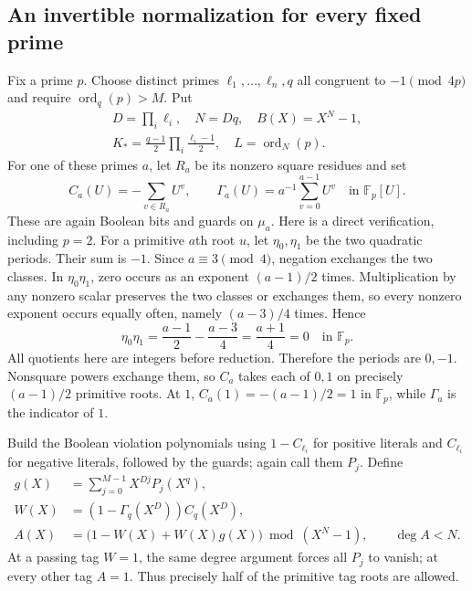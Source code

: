 \subsection{An invertible normalization for every fixed prime}
Fix a prime $p$. Choose distinct primes $\ell_1,\ldots,\ell_n,q$ all congruent to $-1\pmod{4p}$ and require $\operatorname{ord}_q(p)>M$. Put
\begin{gather*}
 D=\prod_i\ell_i,\quad N=Dq,\quad B(X)=X^N-1,\\
 K_* =\frac{q-1}{2}\prod_i\frac{\ell_i-1}{2},\quad
 L=\operatorname{ord}_N(p).
\end{gather*}
For one of these primes $a$, let $R_a$ be its nonzero square residues and set
\[
 C_a(U)=-\sum_{v\in R_a}U^v,
 \qquad
 \Gamma_a(U)=a^{-1}\sum_{v=0}^{a-1}U^v
 \quad\text{in }\mathbb F_p[U].
\]
These are again Boolean bits and guards on $\mu_a$. Here is a direct verification, including $p=2$. For a primitive $a$th root $u$, let $\eta_0,\eta_1$ be the two quadratic periods. Their sum is $-1$. Since $a\equiv3\pmod4$, negation exchanges the two classes. In $\eta_0\eta_1$, zero occurs as an exponent $(a-1)/2$ times. Multiplication by any nonzero scalar preserves the two classes or exchanges them, so every nonzero exponent occurs equally often, namely $(a-3)/4$ times. Hence
\[
 \eta_0\eta_1=\frac{a-1}{2}-\frac{a-3}{4}
             =\frac{a+1}{4}=0\quad\text{in }\mathbb F_p.
\]
All quotients here are integers before reduction. Therefore the periods are $0,-1$. Nonsquare powers exchange them, so $C_a$ takes each of $0,1$ on precisely $(a-1)/2$ primitive roots. At $1$, $C_a(1)=-(a-1)/2=1$ in $\mathbb F_p$, while $\Gamma_a$ is the indicator of $1$.

Build the Boolean violation polynomials using $1-C_{\ell_i}$ for positive literals and $C_{\ell_i}$ for negative literals, followed by the guards; again call them $P_j$. Define
\begin{align}
 g(X)&=\sum_{j=0}^{M-1}X^{Dj}P_j(X^q),\\
 W(X)&=(1-\Gamma_q(X^D))C_q(X^D),\\
 A(X)&=\bigl(1-W(X)+W(X)g(X)\bigr)\bmod (X^N-1),
 \qquad \deg A<N.
\end{align}
At a passing tag $W=1$, the same degree argument forces all $P_j$ to vanish; at every other tag $A=1$. Thus precisely half of the primitive tag roots are allowed.

